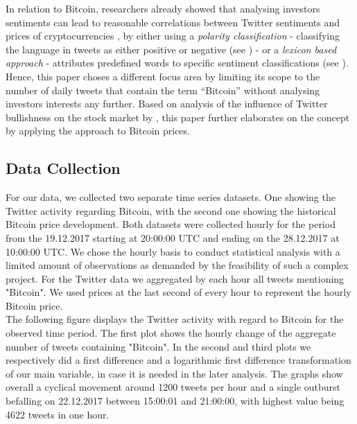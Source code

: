 \documentclass[a4paper,american,12pt]{article}
\begin{document}
\begin{spacing}{1.2}
In relation to Bitcoin, researchers already showed that analysing investors sentiments can lead to reasonable correlations between Twitter sentiments and prices of cryptocurrencies \textcite[p.~7]{stenqvist2017predicting} , by either using a \textit{polarity classification} {-} classifying the language in tweets as either positive or negative (see \cite{colianni2015algorithmic}) {-} or a \textit{lexicon based approach} {-} attributes predefined words to specific sentiment classifications (see \cite{stenqvist2017predicting}). Hence, this paper choses a different focus area by limiting its scope to the number of daily tweets that contain the term “Bitcoin” without analysing investors interests any further. Based on analysis of the influence of Twitter bullishness on the stock market by \textcite{mao2015quantifying}, this paper further elaborates on the concept by applying the approach to Bitcoin prices.\\

		
\subsection{Data Collection}
For our data, we collected two separate time series datasets. One showing the Twitter activity regarding Bitcoin, with the second one showing the historical Bitcoin price development. Both datasets were collected hourly for the period from the 19.12.2017 starting at 20:00:00 UTC and ending on the 28.12.2017 at 10:00:00 UTC. We chose the hourly basis to conduct statistical analysis with a limited amount of observations as demanded by the feasibility of such a complex project. For the Twitter data we aggregated by each hour all tweets mentioning "Bitcoin". We used prices at the last second of every hour to represent the hourly Bitcoin price.\\
The following figure displays the Twitter activity with regard to Bitcoin for the observed time period. The first plot shows the hourly change of the aggregate number of tweets containing "Bitcoin". In the second and third plots we respectively did a first difference and a logarithmic first difference transformation of our main variable, in case it is needed in the later analysis. The graphs show overall a cyclical movement around 1200 tweets per hour and a single outburst befalling on 22.12.2017 between 15:00:01 and 21:00:00, with highest value being 4622 tweets in one hour.\\


\end{spacing}
\end{document}
